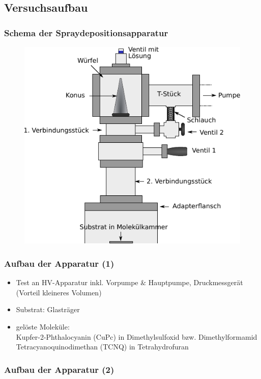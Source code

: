 \documentclass{beamer}
\begin{document}
\subsection[Versuchsaufbau]{Versuchsaufbau}

\begin{frame}
\frametitle{Schema der Spraydepositionsapparatur}
\begin{figure}[H]
\centering
\includegraphics{bilder/wuerfelklein.pdf}
\end{figure}
\end{frame}

\begin{frame}
\frametitle{Aufbau der Apparatur (1)}
\begin{itemize}\setlength{\itemsep}{+15pt}
  \item Test an HV-Apparatur inkl. Vorpumpe $\&$ Hauptpumpe, Druckmessgerät (Vorteil kleineres
  Volumen)
  \item Substrat: Glasträger
  \item gelöste Moleküle: \\
  Kupfer-2-Phthalocyanin (CuPc) in Dimethylsulfoxid bzw. Dimethylformamid\\
  Tetracyanoquinodimethan (TCNQ) in Tetrahydrofuran
\end{itemize}
\end{frame}


\begin{frame}
\frametitle{Aufbau der Apparatur (2)}
\begin{figure}[H]
\centering

\end{figure}
\end{frame}
\end{document}
